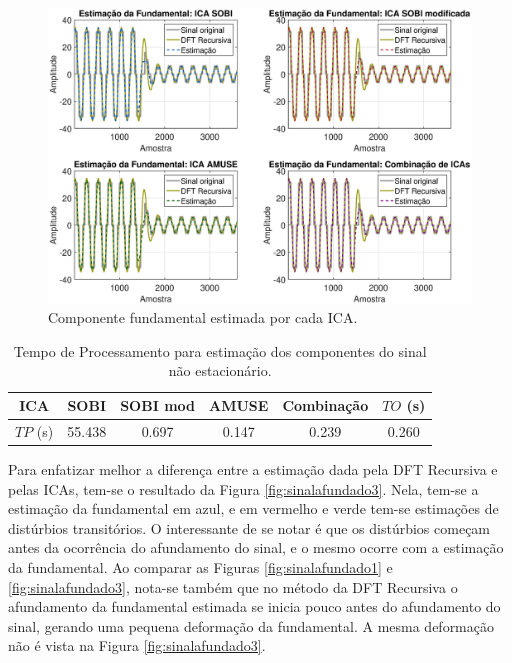 \documentclass[a4paper,12pt]{monografia}
\theoremstyle{plain}
\theoremstyle{definition}
\theoremstyle{remark}
\begin{document}
\begin{figure}[!htb]
    \begin{center}
    \advance\leftskip -1.5cm
    \includegraphics[scale=0.41]{imagens/PlotFundsEstimadas.eps}
    \caption{Componente fundamental estimada por cada ICA.}
    \label{fig:sinalafundado2}    
    \end{center}
\end{figure}

\begin{table}[!htb]
    \begin{center}
        \caption{Tempo de Processamento para estimação dos componentes do sinal não estacionário.}
        \begin{tabular}{c|c c c c c}
        \hline
        ICA & SOBI & SOBI mod & AMUSE & Combinação & $TO$ (s)\\ 
        \hline
        $TP$ (s) & 55.438 & 0.697 & 0.147 & 0.239 & 0.260\\
        \end{tabular}
        \label{tab:sinalaundado}
    \end{center}
\end{table}

Para enfatizar melhor a diferença entre a estimação dada pela DFT Recursiva e pelas ICAs, tem-se o resultado da Figura \ref{fig:sinalafundado3}. Nela, tem-se a estimação da fundamental em azul, e em vermelho e verde tem-se estimações de distúrbios transitórios. O interessante de se notar é que os distúrbios começam antes da ocorrência do afundamento do sinal, e o mesmo ocorre com a estimação da fundamental. Ao comparar as Figuras \ref{fig:sinalafundado1}  e \ref{fig:sinalafundado3}, nota-se também que no método da DFT Recursiva o afundamento da fundamental estimada se inicia pouco antes do afundamento do sinal, gerando uma pequena deformação da fundamental. A mesma deformação não é vista na Figura \ref{fig:sinalafundado3}.
\end{document}
